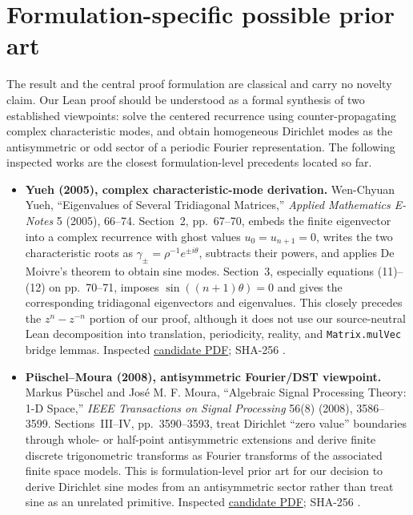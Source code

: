\documentclass[11pt]{article}
\begin{document}
\section{Formulation-specific possible prior art}
The result and the central proof formulation are classical and carry no novelty claim. Our Lean
proof should be understood as a formal synthesis of two established viewpoints: solve the centered
recurrence using counter-propagating complex characteristic modes, and obtain homogeneous
Dirichlet modes as the antisymmetric or odd sector of a periodic Fourier representation. The
following inspected works are the closest formulation-level precedents located so far.

\begin{itemize}
\item \textbf{Yueh (2005), complex characteristic-mode derivation.} Wen-Chyuan Yueh,
``Eigenvalues of Several Tridiagonal Matrices,'' \emph{Applied Mathematics E-Notes} 5
(2005), 66--74. Section~2, pp.~67--70, embeds the finite eigenvector into a complex
recurrence with ghost values $u_0=u_{n+1}=0$, writes the two characteristic roots as
$\gamma_{\pm}=\rho^{-1}e^{\pm i\theta}$, subtracts their powers, and applies De Moivre's
theorem to obtain sine modes. Section~3, especially equations (11)--(12) on pp.~70--71,
imposes $\sin((n+1)\theta)=0$ and gives the corresponding tridiagonal eigenvectors and
eigenvalues. This closely precedes the $z^n-z^{-n}$ portion of our proof, although it does
not use our source-neutral Lean decomposition into translation, periodicity, reality, and
\texttt{Matrix.mulVec} bridge lemmas. Inspected \href{https://www.math.nthu.edu.tw/~amen/2005/040903-7.pdf}{candidate PDF};
SHA-256 \texttt{}.

\item \textbf{Püschel--Moura (2008), antisymmetric Fourier/DST viewpoint.} Markus Püschel and
José M. F. Moura, ``Algebraic Signal Processing Theory: 1-D Space,'' \emph{IEEE
Transactions on Signal Processing} 56(8) (2008), 3586--3599. Sections~III--IV,
pp.~3590--3593, treat Dirichlet ``zero value'' boundaries through whole- or half-point
antisymmetric extensions and derive finite discrete trigonometric transforms as Fourier
transforms of the associated finite space models. This is formulation-level prior art for
our decision to derive Dirichlet sine modes from an antisymmetric sector rather than treat
sine as an unrelated primitive. Inspected
\href{https://users.ece.cmu.edu/~moura/papers/t-sp-aug08-part2--pueschelmoura-ieeexplore.pdf}{candidate PDF};
SHA-256 \texttt{}.


\end{itemize}
\end{document}
